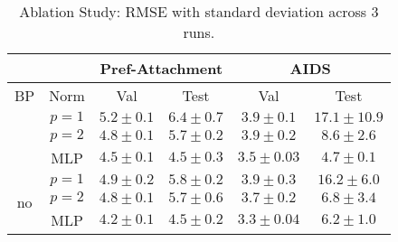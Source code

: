 \begin{table}[htbp]
    \addtolength{\tabcolsep}{-1pt}
    \fontsize{9pt}{10.25pt}\selectfont
    \centering
    \renewcommand{\arraystretch}{1.2}
    \begin{tabular}{|c|c|c|c|c|c|}
        \hline
        \multicolumn{2}{|c|}{} & \multicolumn{2}{c|}{Pref-Attachment} & \multicolumn{2}{c|}{AIDS} \\ \hline
        BP & Norm & Val & Test & Val & Test \\ \hhline{|=|=|=|=|=|=|}
        \multirow{3}{*}{yes} & $p=1$ & $5.2 \pm 0.1$ & $6.4 \pm 0.7$ & $3.9 \pm 0.1$ & $17.1 \pm 10.9$ \\ \hhline{|~|-|-|-|-|-|}
        & $p=2$ & $4.8 \pm 0.1$ & $5.7 \pm 0.2$ & $3.9 \pm 0.2$ & $8.6 \pm 2.6$ \\ \hhline{|~|-|-|-|-|-|}
        & MLP & $4.5 \pm 0.1$ & $\boldsymbol{4.5 \pm 0.3}$ & $3.5 \pm 0.03$ & $\boldsymbol{4.7 \pm 0.1}$ \\ \hline
        \multirow{3}{*}{no}  & $p=1$ & $4.9 \pm 0.2$ & $5.8 \pm 0.2$ & $3.9 \pm 0.3$ & $16.2 \pm 6.0$ \\ \hhline{|~|-|-|-|-|-|}
        & $p=2$ & $4.8 \pm 0.1$ & $5.7 \pm 0.6$ & $3.7 \pm 0.2$ & $6.8 \pm 3.4$ \\ \hhline{|~|-|-|-|-|-|}
        & MLP & $4.2 \pm 0.1$ & $\boldsymbol{4.5 \pm 0.2}$ & $3.3 \pm 0.04$ & $6.2 \pm 1.0$ \\ \hline
    \end{tabular}
    \caption{Ablation Study: RMSE with standard deviation across 3 runs.}
    \label{tab:ex1-ablation}
\end{table}



